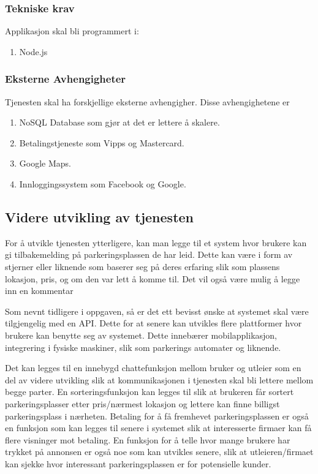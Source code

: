 \subsubsection{Tekniske krav}
\label{teknisk_krav}
Applikasjon skal bli programmert i: 
\begin{enumerate}[label=\alph*]
    \item Node.js
    
\end{enumerate}


\subsubsection{Eksterne Avhengigheter}
\label{ekstern_avhengihet}
Tjenesten skal ha forskjellige eksterne avhengigher. Disse avhengighetene er
\begin{enumerate}[label=(\alph*)]
    \item NoSQL Database som gjør at det er lettere å skalere.
    \item Betalingstjeneste som Vipps og Mastercard.
    \item Google Maps.
    \item Innloggingssystem som Facebook og Google.
\end{enumerate}


\subsection{Videre utvikling av tjenesten}
For å utvikle tjenesten ytterligere, kan man legge til et system hvor brukere kan gi tilbakemelding på parkeringsplassen de har leid. Dette kan være i form av stjerner eller liknende som baserer seg på deres erfaring slik som plassens lokasjon, pris, og om den var lett å komme til. Det vil også være mulig å legge inn en kommentar

Som nevnt tidligere i oppgaven, så er det ett bevisst ønske at systemet skal være tilgjengelig med en API. Dette for at senere kan utvikles flere plattformer hvor brukere kan benytte seg av systemet. Dette innebærer mobilapplikasjon, integrering i fysiske maskiner, slik som parkerings automater og liknende.

Det kan legges til en innebygd chattefunksjon mellom bruker og utleier som en del av videre utvikling slik at kommunikasjonen i tjenesten skal bli lettere mellom begge parter. En sorteringsfunksjon kan legges til slik at brukeren får sortert parkeringsplasser etter pris/nærmest lokasjon og lettere kan finne billigst parkeringsplass i nærheten. Betaling for å få fremhevet parkeringsplassen er også en funksjon som kan legges til senere i systemet slik at interesserte firmaer kan få flere visninger mot betaling. En funksjon for å telle hvor mange brukere har trykket på annonsen er også noe som kan utvikles senere, slik at utleieren/firmaet kan sjekke hvor interessant parkeringsplassen er for potensielle kunder.  

